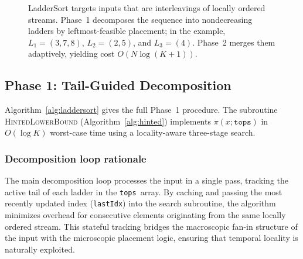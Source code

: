 \documentclass[12pt,a4paper]{article}
\theoremstyle{plain}
\theoremstyle{definition}
\newcommand{\tops}{\texttt{tops}}
\newcommand{\lastIdx}{\texttt{lastIdx}}
\begin{document}
\begin{figure}[H]
{%
}
\caption{LadderSort targets inputs that are interleavings of locally ordered
  streams.  Phase~1 decomposes the sequence into nondecreasing ladders by leftmost-feasible placement; in the example, $L_1=(3,7,8)$, $L_2=(2,5)$, and $L_3=(4)$.  Phase~2 merges them adaptively, yielding cost $O(N\log(K+1))$.}
\label{fig:overview}
\end{figure}

\subsection{Phase 1: Tail-Guided Decomposition}
\label{sec:phase1}

Algorithm~\ref{alg:laddersort} gives the full Phase~1 procedure.
The subroutine \textsc{HintedLowerBound} (Algorithm~\ref{alg:hinted})
implements $\pi(x;\tops)$ in $O(\log K)$ worst-case time using a
locality-aware three-stage search.



\subsubsection{Decomposition loop rationale}
The main decomposition loop processes the input in a single pass, tracking the active tail of each ladder in the \tops\ array. By caching and passing the most recently updated index (\lastIdx) into the search subroutine, the algorithm minimizes overhead for consecutive elements originating from the same locally ordered stream. This stateful tracking bridges the macroscopic fan-in structure of the input with the microscopic placement logic, ensuring that temporal locality is naturally exploited.
\end{document}
